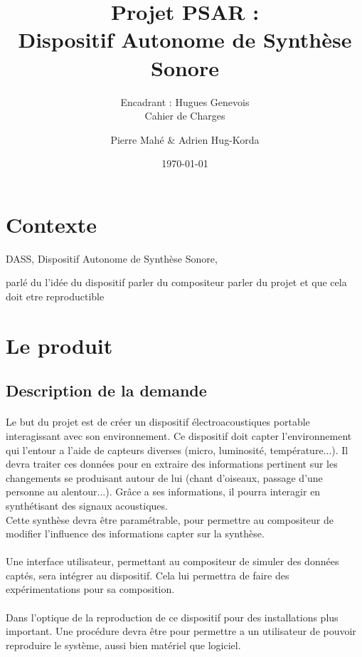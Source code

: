 \documentclass[a4paper, titlepage, oneside, 12pt]{article}%
\title{Projet PSAR :\\ Dispositif Autonome de Synthèse Sonore}
\subtitle{Encadrant : Hugues Genevois \\ Cahier de Charges}
\author{Pierre Mahé \& Adrien Hug-Korda}
\date{\today}
\begin{document}
 
\maketitle 
\tableofcontents

\newpage

\section{Contexte}
DASS, Dispositif Autonome de Synthèse Sonore,

parlé du l'idée du dispositif 
parler du compositeur 
parler du projet et que cela doit etre reproductible


\section{Le produit}
\subsection{Description de la demande}

\paragraph{}
Le but du projet est de créer un dispositif électroacoustiques portable interagissant avec son environnement.
Ce dispositif doit capter l'environnement qui l'entour a l'aide de capteurs diverses (micro, luminosité, température...). Il devra traiter ces données pour en extraire des informations pertinent sur les changements se produisant autour de lui (chant d'oiseaux, passage d'une personne au alentour...).
Grâce a ses informations, il pourra interagir en synthétisant des signaux acoustiques. \\
Cette synthèse devra être paramétrable, pour permettre au compositeur de modifier l’influence des informations capter sur la synthèse.

\paragraph{}
Une interface utilisateur, permettant au compositeur de simuler des données captés, sera intégrer au dispositif. Cela lui permettra de faire des expérimentations pour sa composition.

\paragraph{}
Dans l'optique de la reproduction de ce dispositif pour des installations plus important. Une procédure devra être pour permettre a un utilisateur de pouvoir reproduire le système, aussi bien matériel que logiciel.
\end{document}
